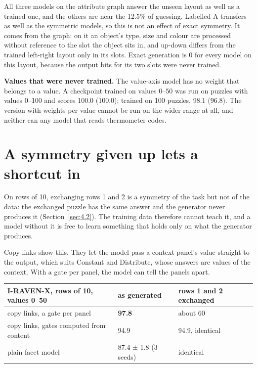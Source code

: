 All three models on the attribute graph answer the unseen layout as well as a trained one, and the others are near the 12.5\% of guessing. Labelled A transfers as well as the symmetric models, so this is not an effect of exact symmetry. It comes from the graph: on it an object's type, size and colour are processed without reference to the slot the object sits in, and up-down differs from the trained left-right layout only in its slots. Exact generation is 0 for every model on this layout, because the output bits for its two slots were never trained.

\textbf{Values that were never trained.} The value-axis model has no weight that belongs to a value. A checkpoint trained on values 0–50 was run on puzzles with values 0–100 and scores 100.0 (100.0); trained on 100 puzzles, 98.1 (96.8). The version with weights per value cannot be run on the wider range at all, and neither can any model that reads thermometer codes.

\section{A symmetry given up lets a shortcut in}\label{sec:6.5}

On rows of 10, exchanging rows 1 and 2 is a symmetry of the task but not of the data: the exchanged puzzle has the same answer and the generator never produces it (Section~\ref{sec:4.2}). The training data therefore cannot teach it, and a model without it is free to learn something that holds only on what the generator produces.

Copy links show this. They let the model pass a context panel's value straight to the output, which suits Constant and Distribute, whose answers are values of the context. With a gate per panel, the model can tell the panels apart.

\begin{center}\small
\begin{tabularx}{\linewidth}{@{}YYY@{}}
\toprule
I-RAVEN-X, rows of 10, values 0–50 & as generated & rows 1 and 2 exchanged \\
\midrule
copy links, a gate per panel & \textbf{97.8} & about 60 \\
copy links, gates computed from content & 94.9 & 94.9, identical \\
plain facet model & 87.4 ± 1.8 (3 seeds) & identical \\
\bottomrule
\end{tabularx}
\end{center}

